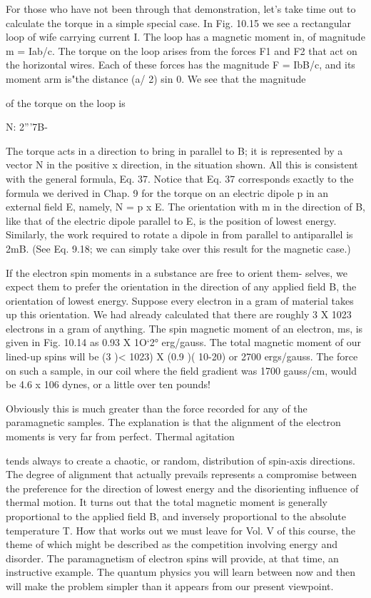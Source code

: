 {For those who have not been through that demonstration, let's take
time out to calculate the torque in a simple special case. In Fig. 10.15
we see a rectangular loop of wife carrying current I. The loop has
a magnetic moment in, of magnitude m = Iab/c. The torque on
the loop arises from the forces F1 and F2 that act on the horizontal
wires. Each of these forces has the magnitude F = IbB/c, and its
moment arm is"the distance (a/ 2) sin 0. We see that the magnitude

of the torque on the loop is

N: 2'''7B-%

The torque acts in a direction to bring in parallel to B; it is represented
by a vector N in the positive x direction, in the situation
shown. All this is consistent with the general formula, Eq. 37.
Notice that Eq. 37 corresponds exactly to the formula we derived
in Chap. 9 for the torque on an electric dipole p in an external field E,
namely, N = p x E. The orientation with m in the direction of B,
like that of the electric dipole parallel to E, is the position of lowest
energy. Similarly, the work required to rotate a dipole in from parallel
to antiparallel is 2mB. (See Eq. 9.18; we can simply take over
this result for the magnetic case.)

If the electron spin moments in a substance are free to orient them-
selves, we expect them to prefer the orientation in the direction of
any applied field B, the orientation of lowest energy. Suppose every
electron in a gram of material takes up this orientation. We had
already calculated that there are roughly 3 X 1023 electrons in a gram
of anything. The spin magnetic moment of an electron, ms, is given
in Fig. 10.14 as 0.93 X 1O‘2° erg/gauss. The total magnetic moment
of our lined-up spins will be (3 )< 1023) X (0.9 )( 10-20) or 2700
ergs/gauss. The force on such a sample, in our coil where the field
gradient was 1700 gauss/cm, would be 4.6 x 106 dynes, or a little
over ten pounds!

Obviously this is much greater than the force recorded for any of
the paramagnetic samples. The explanation is that the alignment
of the electron moments is very far from perfect. Thermal agitation

tends always to create a chaotic, or random, distribution of spin-axis
directions. The degree of alignment that actually prevails represents
a compromise between the preference for the direction of lowest
energy and the disorienting influence of thermal motion. It turns
out that the total magnetic moment is generally proportional to the
applied field B, and inversely proportional to the absolute temperature
T. How that works out we must leave for Vol. V of this course,
the theme of which might be described as the competition involving
energy and disorder. The paramagnetism of electron spins will
provide, at that time, an instructive example. The quantum physics
you will learn between now and then will make the problem simpler
than it appears from our present viewpoint.

}
